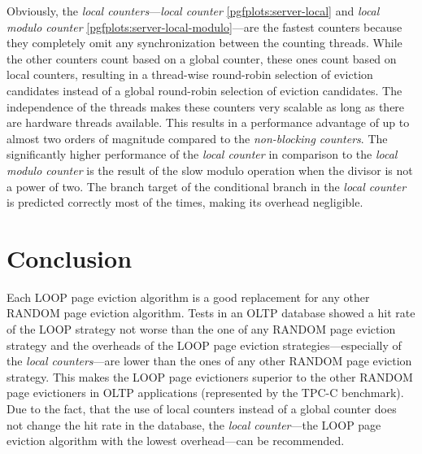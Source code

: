 \begin{@empty}
    Obviously, the \emph{local counters}---\emph{local counter} \ref{pgfplots:server-local} and \emph{local modulo counter} \ref{pgfplots:server-local-modulo}---are the fastest counters because they completely omit any synchronization between the counting threads. While the other counters count based on a global counter, these ones count based on local counters, resulting in a thread-wise round-robin selection of eviction candidates instead of a global round-robin selection of eviction candidates. The independence of the threads makes these counters very scalable as long as there are hardware threads available. This results in a performance advantage of up to almost two orders of magnitude compared to the \emph{non-blocking counters}. The significantly higher performance of the \emph{local counter} in comparison to the \emph{local modulo counter} is the result of the slow modulo operation when the divisor is not a power of two. The branch target of the conditional branch in the \emph{local counter} is predicted correctly most of the times, making its overhead negligible.
\end{@empty}

\section{Conclusion}

    Each LOOP page eviction algorithm is a good replacement for any other RANDOM page eviction algorithm. Tests in an OLTP database showed a hit rate of the LOOP strategy not worse than the one of any RANDOM page eviction strategy and the overheads of the LOOP page eviction strategies---especially of the \emph{local counters}---are lower than the ones of any other RANDOM page eviction strategy. This makes the LOOP page evictioners superior to the other RANDOM page evictioners in OLTP applications (represented by the TPC-C benchmark). Due to the fact, that the use of local counters instead of a global counter does not change the hit rate in the database, the \emph{local counter}---the LOOP page eviction algorithm with the lowest overhead---can be recommended.
